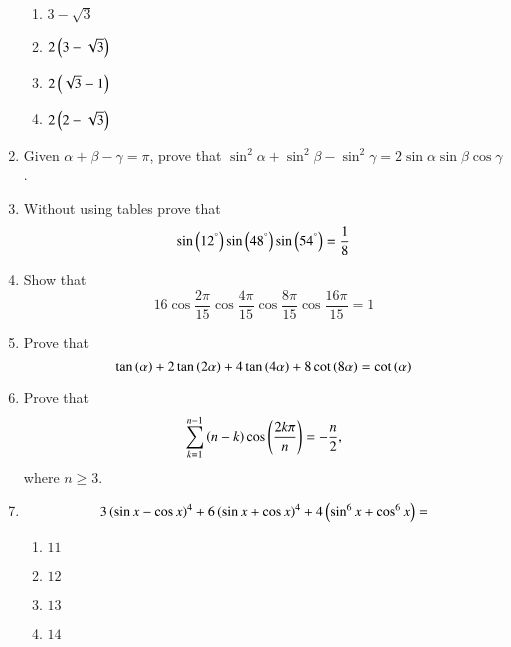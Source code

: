 \begin{enumerate}[label=\thesubsection.\arabic*,ref=\thesubsection.\theenumi]
\begin{multicols}{4}
\begin{enumerate}
\item $3-\sqrt{3}$
\item $2\left(3-\sqrt{3}\right)$
\item $2\left(\sqrt{3}-1\right)$
\item $2\left(2-\sqrt{3}\right)$
\end{enumerate}
\end{multicols}
\item Given $\alpha+\beta-\gamma=\pi$, prove that $\sin^2{\alpha}+\sin^2{\beta}-\sin^2{\gamma}=2\sin{\alpha}\sin{\beta}\cos{\gamma}$. \hfill{}
\item Without using tables prove that 
\hfill {}
$$ 
\sin\left(12^{\degree}\right)\sin\left(48^{\degree}\right)\sin\left(54^{\degree}\right)= \frac{1}{8}
$$
\item Show that 
\hfill{}
$$
16{\cos{\frac{2\pi}{15}}}{\cos{\frac{4\pi}{15}}}{\cos{\frac{8\pi}{15}}}{\cos{\frac{16\pi}{15}}}=1
$$
\item Prove that 
\hfill{}
$$
\tan \left(\alpha\right)+2\tan \left(2\alpha\right)+4\tan \left(4\alpha\right)+8\cot \left(8\alpha\right)=\cot \left(\alpha\right)
$$
\item Prove that 
\hfill{}
$$
\sum_{k=1}^{n-1} \left(n-k\right)\cos\left( \frac{2k\pi}{n}\right)=-\frac{n}{2}
,
$$
 where $n\ge3$.
	\item 
        \hfill{}
		\begin{align*}
		3\left(\sin{x} - \cos{x}\right)^4 + 6\left(\sin{x} + \cos{x}\right)^4 +  4\left(\sin^6{x}+\cos^6{x}\right) =
	\end{align*}
\begin{multicols}{4}
\begin{enumerate}
                \item $11$
                \item $12$
                \item $13$
                \item $14$
        \end{enumerate}
\end{multicols}   
%
\end{enumerate}
